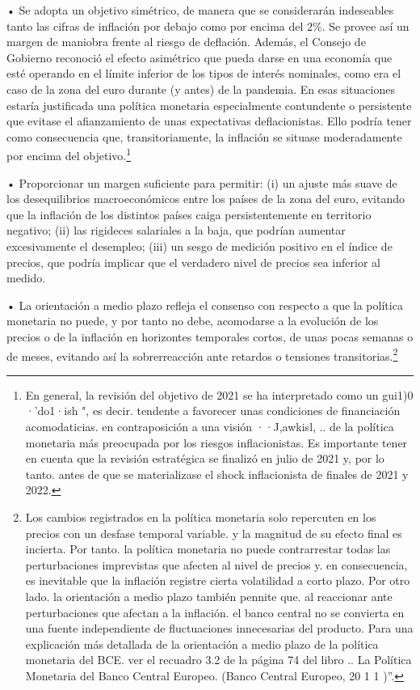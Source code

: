\documentclass[10pt,a4paper]{article}
\begin{document}
{• Se adopta un objetivo simétrico, de manera que se considerarán indeseables tanto las cifras de inflación por debajo como por encima del $2\%$. Se provee así un margen de maniobra frente al riesgo de deflación. Además, el Consejo de Gobierno reconoció el efecto asimétrico que pueda darse en una economía que esté operando en el límite inferior de los tipos de interés nominales, como era el caso de la zona del euro durante (y antes) de la pandemia. En esas situaciones estaría justificada una política monetaria especialmente contundente o persistente que evitase el afianzamiento de unas expectativas deflacionistas. Ello podría tener como consecuencia que, transitoriamente, la inflación se situase moderadamente por encima del objetivo.\footnote{%
    En general, la revisión del objetivo de 2021 se ha interpretado como un gui1)0 ·'do1·ish ", es decir. tendente a favorecer unas condiciones de financiación acomodaticias. en contraposición a una visión ··J,awkisl, .. de la política monetaria más preocupada por los riesgos inflacionistas. Es importante tener en cuenta que la revisión estratégica se finalizó en julio de 2021 y, por lo tanto. antes de que se materializase el shock inflacionista de finales de 2021 y 2022.
}

• Proporcionar un margen suficiente para permitir: (i) un ajuste más suave de los desequilibrios macroeconómicos entre los países de la zona del euro, evitando que la inflación de los distintos países caiga persistentemente en territorio negativo; (ii) las rigideces salariales a la baja, que podrían aumentar excesivamente el desempleo; (iii) un sesgo de medición positivo en el índice de precios, que podría implicar que el verdadero nivel de precios sea inferior al medido.

• La orientación a medio plazo refleja el consenso con respecto a que la política monetaria no puede, y por tanto no debe, acomodarse a la evolución de los precios o de la inflación en horizontes temporales cortos, de unas pocas semanas o de meses, evitando así la sobrerreacción ante retardos o tensiones transitorias.\footnote{%
    Los cambios registrados en la política monetaria solo repercuten en los precios con un desfase temporal variable. y la magnitud de su efecto final es incierta. Por tanto. la política monetaria no puede contrarrestar todas las perturbaciones imprevistas que afecten al nivel de precios y. en consecuencia, es inevitable que la inflación registre cierta volatilidad a corto plazo. Por otro lado. la orientación a medio plazo también pennite que. al reaccionar ante perturbaciones que afectan a la inflación. el banco central no se convierta en una fuente independiente de fluctuaciones innecesarias del producto. Para una explicación más detallada de la orientación a medio plazo de la política monetaria del BCE. ver el recuadro 3.2 de la página 74 del libro .. La Política Monetaria del Banco Central Europeo. (Banco Central Europeo, 20 1 1 )''.
}

}
\end{document}
